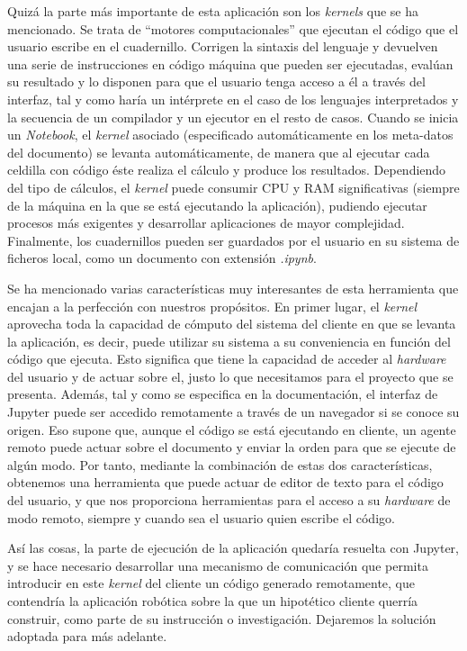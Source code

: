 Quizá la parte más importante de esta aplicación son los \textit{kernels} que se ha mencionado. Se trata de ``motores computacionales'' que ejecutan el código que el usuario escribe en el cuadernillo. Corrigen la sintaxis del lenguaje y devuelven una serie de instrucciones en código máquina que pueden ser ejecutadas, evalúan su resultado y lo disponen para que el usuario tenga acceso a él a través del interfaz, tal y como haría un intérprete en el caso de los lenguajes interpretados y la secuencia de un compilador y un ejecutor en el resto de casos. Cuando se inicia un \textit{Notebook}, el \textit{kernel} asociado (especificado automáticamente en los meta-datos del documento) se levanta automáticamente, de manera que al ejecutar cada celdilla con código éste realiza el cálculo y produce los resultados. Dependiendo del tipo de cálculos, el \textit{kernel}
puede consumir CPU y RAM significativas (siempre de la máquina en la que se está ejecutando la aplicación), pudiendo ejecutar procesos más exigentes y desarrollar aplicaciones de mayor complejidad. Finalmente, los cuadernillos pueden ser guardados por el usuario en su sistema de ficheros local, como un documento con extensión \textit{.ipynb}.

Se ha mencionado varias características muy interesantes de esta herramienta que encajan a la perfección con nuestros propósitos. En primer lugar, el \textit{kernel} aprovecha toda la capacidad de cómputo del sistema del cliente en que se levanta la aplicación, es decir, puede utilizar su sistema a su conveniencia en función del código que ejecuta. Esto significa que tiene la capacidad de acceder al \textit{hardware} del usuario y de actuar sobre el, justo lo que necesitamos para el proyecto que se presenta. Además, tal y como se especifica en la documentación, el interfaz de Jupyter puede ser accedido remotamente a través de un navegador si se conoce su origen. Eso supone que, aunque el código se está ejecutando en cliente, un agente remoto puede actuar sobre el documento y enviar la orden para que se ejecute de algún modo. Por tanto, mediante la combinación de estas dos características, obtenemos una herramienta que puede actuar de editor de texto para el código del usuario, y que nos proporciona herramientas para el acceso a su \textit{hardware} de modo remoto, siempre y cuando sea el usuario quien escribe el código. 

Así las cosas, la parte de ejecución de la aplicación quedaría resuelta con Jupyter, y se hace necesario desarrollar una mecanismo de comunicación que permita introducir en este \textit{kernel} del cliente un código generado remotamente, que contendría la aplicación robótica sobre la que un hipotético cliente querría construir, como parte de su instrucción o investigación. Dejaremos la solución adoptada para más adelante.

